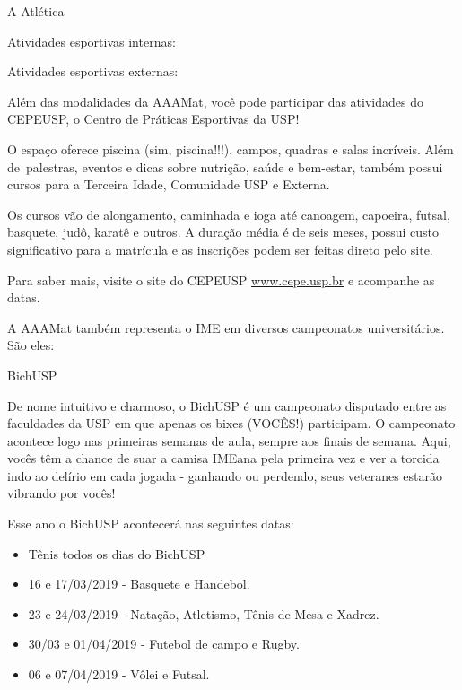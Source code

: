 \begin{secao}{A Atlética}
\begin{subsecao}{Atividades esportivas internas:}
\end{subsecao}

\begin{subsecao}{Atividades esportivas externas:}

Além das modalidades da AAAMat, você pode participar das atividades do CEPEUSP, o 
Centro de Práticas Esportivas da USP! 

O espaço oferece piscina (sim, piscina!!!), campos, quadras e salas incríveis. Além 
de palestras, eventos e dicas sobre nutrição, saúde e bem-estar, também possui 
cursos para a Terceira Idade, Comunidade USP e Externa. 

Os cursos vão de alongamento, caminhada e ioga até canoagem, capoeira, futsal, 
basquete, judô, karatê e outros. A duração média é de seis meses, possui custo 
significativo para a matrícula e as inscrições podem ser feitas direto pelo site. 

Para saber mais, visite o site do CEPEUSP \url{www.cepe.usp.br} e acompanhe as
datas. 

\end{subsecao}

A AAAMat também representa o IME em diversos campeonatos universitários. São
eles:

\begin{subsecao}{BichUSP}

De nome intuitivo e charmoso, o BichUSP é um campeonato disputado entre as
faculdades da USP em que apenas os bixes (VOCÊS!) participam. O campeonato
acontece logo nas primeiras semanas de aula, sempre aos finais de semana. Aqui,
vocês têm a chance de suar a camisa IMEana pela primeira vez e ver a torcida
indo ao delírio em cada jogada - ganhando ou perdendo, seus veteranes estarão
vibrando por vocês!

Esse ano o BichUSP acontecerá nas seguintes datas:

\begin{itemize}
  \item Tênis todos os dias do BichUSP
  \item 16 e 17/03/2019 - Basquete e Handebol.
  \item 23 e 24/03/2019 - Natação, Atletismo, Tênis de Mesa e Xadrez.
  \item 30/03 e 01/04/2019 - Futebol de campo e Rugby.
  \item 06 e 07/04/2019 - Vôlei e Futsal.  
\end{itemize}


\end{subsecao}
\end{secao}
